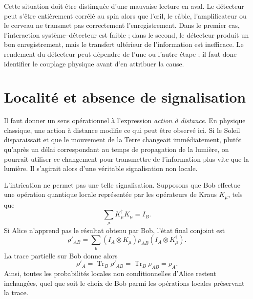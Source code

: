 Cette situation doit être distinguée d’une mauvaise lecture en aval. Le détecteur peut s’être entièrement corrélé au spin alors que l’œil, le câble, l’amplificateur ou le cerveau ne transmet pas correctement l’enregistrement. Dans le premier cas, l’interaction système--détecteur est faible ; dans le second, le détecteur produit un bon enregistrement, mais le transfert ultérieur de l’information est inefficace. Le rendement du détecteur peut dépendre de l’une ou l’autre étape ; il faut donc identifier le couplage physique avant d’en attribuer la cause.

\begin{classroomqa}
\end{classroomqa}

\section{Localité et absence de signalisation}

Il faut donner un sens opérationnel à l'expression \emph{action à distance}. En physique classique, une action à distance modifie ce qui peut être observé ici. Si le Soleil disparaissait et que le mouvement de la Terre changeait immédiatement, plutôt qu'après un délai correspondant au temps de propagation de la lumière, on pourrait utiliser ce changement pour transmettre de l'information plus vite que la lumière. Il s'agirait alors d'une véritable signalisation non locale.

L'intrication ne permet pas une telle signalisation. Supposons que Bob effectue une opération quantique locale représentée par les opérateurs de Kraus \(K_\mu\), tels que
\begin{equation}
\sum_\mu K_\mu^\dagger K_\mu=I_B.
\end{equation}
Si Alice n'apprend pas le résultat obtenu par Bob, l'état final conjoint est
\begin{equation}
\rho'_{AB}
=\sum_\mu
(I_A\otimes K_\mu)\rho_{AB}
(I_A\otimes K_\mu^\dagger).
\end{equation}
La trace partielle sur Bob donne alors
\begin{equation}
\rho'_A
=\operatorname{Tr}_B\rho'_{AB}
=\operatorname{Tr}_B\rho_{AB}
=\rho_A.
\label{eq:l7-no-signaling}
\end{equation}
Ainsi, toutes les probabilités locales non conditionnelles d'Alice restent inchangées, quel que soit le choix de Bob parmi les opérations locales préservant la trace.

